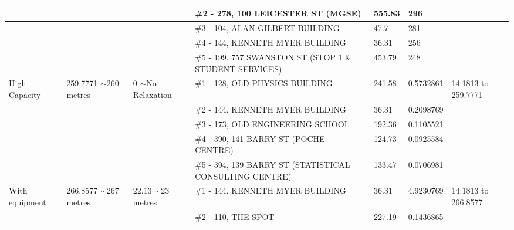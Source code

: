 \begin{table}[H]
{\begin{tabular}{|l|l|l|l|l|l|l|}
                        &                           &                          & \#2 - 278, 100 LEICESTER ST (MGSE)                      & 555.83        & 296             &                           \\ \hline
                        &                           &                          & \#3 - 104, ALAN GILBERT BUILDING                        & 47.7          & 281             &                           \\ \hline
                        &                           &                          & \#4 - 144, KENNETH MYER BUILDING                        & 36.31         & 256             &                           \\ \hline
                        &                           &                          & \#5 - 199, 757 SWANSTON ST (STOP 1 \& STUDENT SERVICES) & 453.79        & 248             &                           \\ \hline
High Capacity           & 259.7771 $\sim$260 metres & 0 $\sim$No Relaxation    & \#1 - 128, OLD PHYSICS BUILDING                         & 241.58        & 0.5732861       & 14.1813 to 259.7771       \\ \hline
                        &                           &                          & \#2 - 144, KENNETH MYER BUILDING                        & 36.31         & 0.2098769       &                           \\ \hline
                        &                           &                          & \#3 - 173, OLD ENGINEERING SCHOOL                       & 192.36        & 0.1105521       &                           \\ \hline
                        &                           &                          & \#4 - 390, 141 BARRY ST (POCHE CENTRE)                  & 124.73        & 0.0925584       &                           \\ \hline
                        &                           &                          & \#5 - 394, 139 BARRY ST (STATISTICAL CONSULTING CENTRE) & 133.47        & 0.0706981       &                           \\ \hline
With equipment         & 266.8577 $\sim$267 metres & 22.13 $\sim$23 metres    & \#1 - 144, KENNETH MYER BUILDING                        & 36.31         & 4.9230769       & 14.1813 to 266.8577       \\ \hline
                        &                           &                          & \#2 - 110, THE SPOT                                     & 227.19        & 0.1436865       &                           \\ \hline

\end{tabular}}
\end{table}
